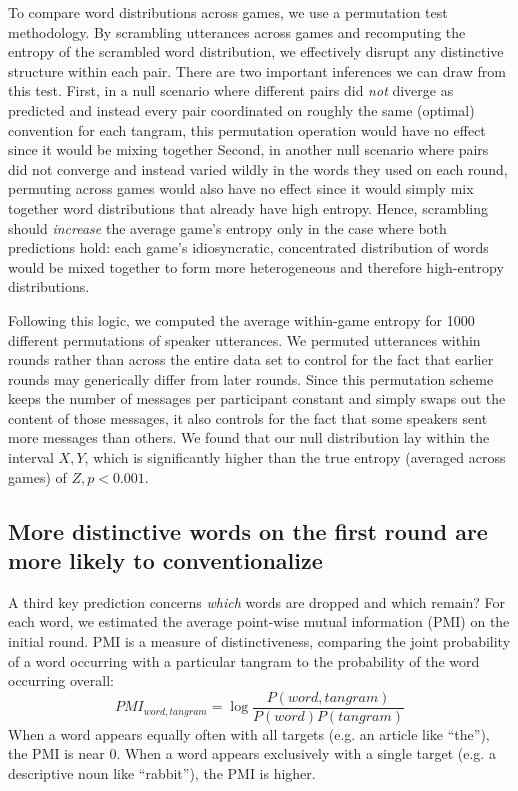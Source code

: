 \documentclass[alpha-refs]{wiley-article}
\begin{document}
To compare word distributions across games, we use a permutation test methodology.
By scrambling utterances across games and recomputing the entropy of the scrambled word distribution, we effectively disrupt any distinctive structure within each pair.
There are two important inferences we can draw from this test.
First, in a null scenario where different pairs did \emph{not} diverge as predicted and instead every pair coordinated on roughly the same (optimal) convention for each tangram, this permutation operation would have no effect since it would be mixing together 
Second, in another null scenario where pairs did not converge and instead varied wildly in the words they used on each round, permuting across games would also have no effect since it would simply mix together word distributions that already have high entropy.
Hence, scrambling should \emph{increase} the average game's entropy only in the case where both predictions hold: each game's idiosyncratic, concentrated distribution of words would be mixed together to form more heterogeneous and therefore high-entropy distributions.

Following this logic, we computed the average within-game entropy for 1000 different permutations of speaker utterances. 
We permuted utterances within rounds rather than across the entire data set to control for the fact that earlier rounds may generically differ from later rounds. 
Since this permutation scheme keeps the number of messages per participant constant and simply swaps out the content of those messages, it also controls for the fact that some speakers sent more messages than others. 
We found that our null distribution lay within the interval $X, Y$, which is significantly higher than the true entropy (averaged across games) of $Z, p < 0.001$.


\subsection{More distinctive words on the first round are more likely to conventionalize}

A third key prediction concerns \emph{which} words are dropped and which remain? 
For each word, we estimated the average point-wise mutual information (PMI) on the initial round. 
PMI is a measure of distinctiveness, comparing the joint probability of a word occurring with a particular tangram to the probability of the word occurring overall: 
$$PMI_{word, tangram} = \log\frac{P(word, tangram)}{P(word)P(tangram)}$$
When a word appears equally often with all targets (e.g. an article like ``the''), the PMI is near 0. 
When a word appears exclusively with a single target (e.g. a descriptive noun like ``rabbit''), the PMI is higher.
\end{document}
